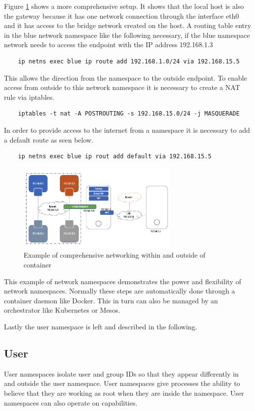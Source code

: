 Figure \ref{sec:intro:containerization:linux_namespaces:netowork_ns_out} shows a more comprehensive setup. 
It shows that the local host is also the gateway because it has one network connection through the interface eth0 and it has access to the bridge network created on the host. 
A routing table entry in the blue network namespace like the following necessary, if the blue namespace network needs to access the endpoint with the IP address 192.168.1.3 
\begin{lstlisting}
	ip netns exec blue ip route add 192.168.1.0/24 via 192.168.15.5
\end{lstlisting}
This allows the direction from the namespace to the outside endpoint. To enable access from outside to this network namespace it is necessary to create a NAT rule via iptables.
\begin{lstlisting}
	iptables -t nat -A POSTROUTING -s 192.168.15.0/24 -j MASQUERADE	
\end{lstlisting}
In order to provide access to the internet from a namespace it is necessary to add a default route as seen below.
\begin{lstlisting}
	ip netns exec blue ip rout add default via 192.168.15.5
\end{lstlisting}
\begin{figure}[htbp]
 \centering
 \includegraphics[width=0.7\textwidth]{gfx/examples/network_ns_out}
 \caption{Example of comprehensive networking within and outside of container}
\label{sec:intro:containerization:linux_namespaces:netowork_ns_out}
\end{figure}
This example of network namespaces demonstrates the power and flexibility of network namespaces.
Normally these steps are automatically done through a container daemon like Docker. This in turn can also be managed by an orchestrator like Kubernetes or Mesos.

Lastly the user namespace is left and described in the following.

\subsection{User}
\label{sec:intro:containerization:linux_namespaces:user_namespaces}
User namespaces isolate user and group IDs so that they appear differently in and outside the user namespace.
User namespaces give processes the ability to believe that they are working as root when they are inside the namespace.
User namespaces can also operate on capabilities. 

